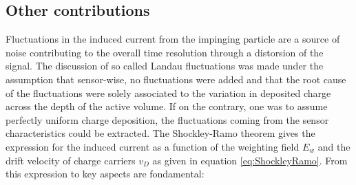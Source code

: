 		\subsection{Other contributions}
		Fluctuations in the induced current from the impinging particle are a source of noise contributing to the overall time resolution through a distorsion of the signal. The discussion of so called Landau fluctuations was made under the assumption that sensor-wise, no fluctuations were added and that the root cause of the fluctuations were solely associated to the variation in deposited charge across the depth of the active volume. If on the contrary, one was to assume perfectly uniform charge deposition, the fluctuations coming from the sensor characteristics could be extracted. The Shockley-Ramo theorem gives the expression for the induced current as a function of the weighting field $E_w$ and the drift velocity of charge carriers $v_D$ as given in equation \ref{eq:ShockleyRamo}. From this expression to key aspects are fondamental: 
